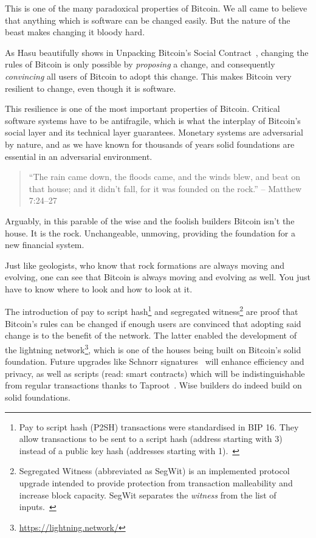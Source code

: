 This is one of the many paradoxical properties of Bitcoin. We all came
to believe that anything which is software can be changed easily. But
the nature of the beast makes changing it bloody hard.

As Hasu beautifully shows in Unpacking Bitcoin's Social
Contract~\cite{social-contract}, changing the rules of Bitcoin is only possible
by \textit{proposing} a change, and consequently \textit{convincing} all users
of Bitcoin to adopt this change. This makes Bitcoin very resilient to change,
even though it is software.

This resilience is one of the most important properties of Bitcoin.
Critical software systems have to be antifragile, which is what the
interplay of Bitcoin's social layer and its technical layer guarantees.
Monetary systems are adversarial by nature, and as we have known for
thousands of years solid foundations are essential in an adversarial
environment.

\begin{quotation}
``The rain came down, the floods came, and the winds blew, and beat on
that house; and it didn't fall, for it was founded on the rock.''
\flushright -- Matthew 7:24--27
\end{quotation}

Arguably, in this parable of the wise and the foolish builders Bitcoin
isn't the house. It is the rock. Unchangeable, unmoving, providing the
foundation for a new financial system.

Just like geologists, who know that rock formations are always moving
and evolving, one can see that Bitcoin is always moving and evolving as
well. You just have to know where to look and how to look at it.

The introduction of pay to script hash\footnote{ Pay to script hash (P2SH)
transactions were standardised in BIP 16. They allow transactions to be sent to
a script hash (address starting with 3) instead of a public key hash (addresses
starting with 1).~\cite{btcwiki:p2sh}} and segregated
witness\footnote{Segregated Witness (abbreviated as SegWit) is an implemented
protocol upgrade intended to provide protection from transaction malleability
and increase block capacity. SegWit separates the \textit{witness} from the list
of inputs.~\cite{btcwiki:segwit}} are proof that Bitcoin's rules can be changed
if enough users are convinced that adopting said change is to the benefit of the
network. The latter enabled the development of the lightning
network\footnote{\url{https://lightning.network/}}, which is one of the houses
being built on Bitcoin's solid foundation. Future upgrades like Schnorr
signatures~\cite{bip:schnorr} will enhance efficiency and privacy, as well as
scripts (read: smart contracts) which will be indistinguishable from regular
transactions thanks to Taproot~\cite{taproot}. Wise builders do indeed build on
solid foundations.

